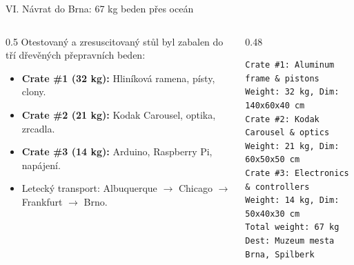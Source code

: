 \documentclass[aspectratio=169,11pt]{beamer}
\begin{document}
\begin{frame}[fragile]{VI. Návrat do Brna: 67 kg beden přes oceán}
  \begin{columns}
    \begin{column}{0.5\textwidth}
      Otestovaný a zresuscitovaný stůl byl zabalen do tří dřevěných přepravních beden:
      \begin{itemize}
        \item \textbf{Crate \#1 (32 kg):} Hliníková ramena, písty, clony.
        \item \textbf{Crate \#2 (21 kg):} Kodak Carousel, optika, zrcadla.
        \item \textbf{Crate \#3 (14 kg):} Arduino, Raspberry Pi, napájení.
        \item Letecký transport: Albuquerque $\rightarrow$ Chicago $\rightarrow$ Frankfurt $\rightarrow$ Brno.
      \end{itemize}
    \end{column}
    \begin{column}{0.48\textwidth}
\begin{lstlisting}[caption=crates.txt (27. 7. 2016)]
Crate #1: Aluminum frame & pistons
Weight: 32 kg, Dim: 140x60x40 cm
Crate #2: Kodak Carousel & optics
Weight: 21 kg, Dim: 60x50x50 cm
Crate #3: Electronics & controllers
Weight: 14 kg, Dim: 50x40x30 cm
Total weight: 67 kg
Dest: Muzeum mesta Brna, Spilberk
\end{lstlisting}
    \end{column}
  \end{columns}
\end{frame}
\end{document}
